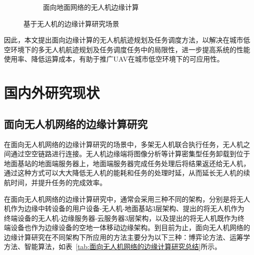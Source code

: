 \begin{figure}[!htbp]
\begin{subfigure}[t]{0.55\textwidth}
\begin{minipage}[b]{1\linewidth}
            \caption{面向地面网络的无人机边缘计算}
            \label{fig:面向地面网络的无人机边缘计算}
        \end{minipage}
    \end{subfigure}
    \caption{基于无人机的边缘计算研究场景}
    \label{fig:基于无人机的边缘计算研究场景}
\end{figure}

因此，本文提出面向边缘计算的无人机航迹规划及任务调度方法，以解决在城市低空环境下的多无人机航迹规划及任务调度任务中的局限性，进一步提高系统的性能使用率、降低运算成本，有助于推广UAV在城市低空环境下的可应用性。

\section{国内外研究现状}

\subsection{面向无人机网络的边缘计算研究}

在面向无人机网络的边缘计算研究的场景中，多架无人机联合执行任务，无人机之间通过空空链路进行连接。无人机边缘端将图像分析等计算密集型任务卸载到位于地面基站的地面端服务器上，地面端服务器完成任务处理后将结果返还给无人机，通过这种方式可以大大降低无人机的能耗和任务的处理时延，从而延长无人机的续航时间，并提升任务的完成效率。

在面向无人机网络的边缘计算研究中，通常会采用三种不同的架构，分别是将无人机作为边缘中转设备的用户设备-无人机-地面基站3层架构、\citet{chen2019WhenUAVSwarmb}提出的将无人机作为终端设备的无人机-边缘服务器-云服务器3层架构，以及\citet{cheng2018AirGroundIntegratedMobile}提出的将无人机既作为终端设备也作为边缘设备的空地一体移动边缘架构。到目前为止，面向无人机网络的边缘计算研究在不同架构下所应用的方法主要分为以下三种：博弈论方法、运筹学方法、智能算法，如表~\ref{tab:面向无人机网络的边缘计算研究总结}所示。

